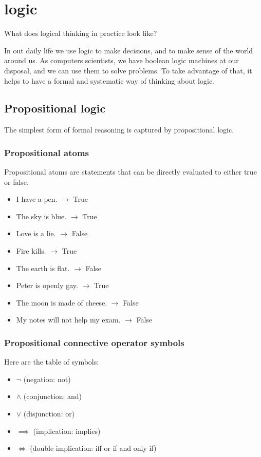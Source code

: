 \documentclass{article}
\begin{document}
\section{logic}

What does logical thinking in practice look like?

In out daily life we use logic to make decisions, and to make sense of the world around us.
As computers scientists, we have boolean logic machines at our disposal, and we can use them to solve problems.
To take advantage of that, it helps to have a formal and systematic way of thinking about logic.

\subsection{Propositional logic}

The simplest form of formal reasoning is captured by propositional logic.

\subsubsection{Propositional atoms}

Propositional atoms are statements that can be directly evaluated to either true or false.

\begin{itemize}
    \item I have a pen. $ \rightarrow $ True
    \item The sky is blue. $ \rightarrow $ True
    \item Love is a lie. $ \rightarrow $ False
    \item Fire kills. $ \rightarrow $ True
    \item The earth is flat. $ \rightarrow $ False
    \item Peter is openly gay. $ \rightarrow $ True
    \item The moon is made of cheese. $ \rightarrow $ False
    \item My notes will not help my exam. $ \rightarrow $ False
\end{itemize}

\subsubsection{Propositional connective operator symbols}

Here are the table of symbols:

\begin{itemize}
    \item $\neg$ (negation: not)
    \item $\land$ (conjunction: and)
    \item $\lor$ (disjunction: or)
    \item $\implies$ (implication: implies)
    \item $\iff$ (double implication: iff or if and only if)
\end{itemize}
\end{document}
